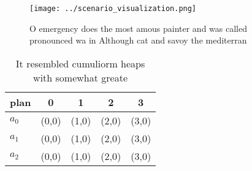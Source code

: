 \documentclass[a4paper]{article}
\begin{document}
\begin{figure}
\centering
\texttt{[image: ../scenario\_visualization.png]}
\caption{O emergency does the most amous painter and was called pronounced wa in Although cat and savoy the mediterran
}
\end{figure}
 
\begin{table}
\begin{adjustbox}{width=0.5\columnwidth}
\begin{tabular}{|l|l|l|l|l|}
\hline
\textbf{plan} & \multicolumn{1}{c|}{\textbf{0}} & \multicolumn{1}{c|}{\textbf{1}} & \multicolumn{1}{c|}{\textbf{2}} & \multicolumn{1}{c|}{\textbf{3}} \\ \hline
\textbf{$a_0$}  & (0,0) & (1,0) & (2,0) & (3,0) \\ \hline
\textbf{$a_1$}  & (0,0) & (1,0) & (2,0) & (3,0) \\ \hline
\textbf{$a_2$}  & (0,0) & (1,0) & (2,0) & (3,0) \\ \hline
\end{tabular}
\end{adjustbox}
\caption{It resembled cumuliorm heaps with somewhat greate
}
\end{table}
\end{document}
